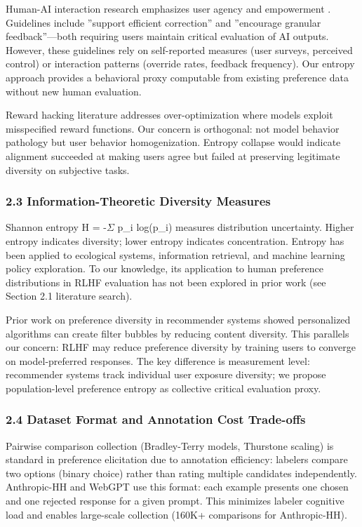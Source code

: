 Human-AI interaction research emphasizes user agency and empowerment \citep{amershi2019guidelines}. Guidelines include ''support efficient correction'' and ''encourage granular feedback''---both requiring users maintain critical evaluation of AI outputs. However, these guidelines rely on self-reported measures (user surveys, perceived control) or interaction patterns (override rates, feedback frequency). Our entropy approach provides a behavioral proxy computable from existing preference data without new human evaluation.

Reward hacking literature \citep{skalse2022misalignment} addresses over-optimization where models exploit misspecified reward functions. Our concern is orthogonal: not model behavior pathology but user behavior homogenization. Entropy collapse would indicate alignment succeeded at making users agree but failed at preserving legitimate diversity on subjective tasks.

\subsubsection{2.3 Information-Theoretic Diversity Measures}

Shannon entropy \citep{shannon1948information} H = -$\Sigma$ p\_i log(p\_i) measures distribution uncertainty. Higher entropy indicates diversity; lower entropy indicates concentration. Entropy has been applied to ecological systems, information retrieval, and machine learning policy exploration. To our knowledge, its application to human preference distributions in RLHF evaluation has not been explored in prior work (see Section 2.1 literature search).

Prior work on preference diversity in recommender systems \citep{nguyen2014exploring} showed personalized algorithms can create filter bubbles by reducing content diversity. This parallels our concern: RLHF may reduce preference diversity by training users to converge on model-preferred responses. The key difference is measurement level: recommender systems track individual user exposure diversity; we propose population-level preference entropy as collective critical evaluation proxy.

\subsubsection{2.4 Dataset Format and Annotation Cost Trade-offs}

Pairwise comparison collection (Bradley-Terry models, Thurstone scaling) is standard in preference elicitation due to annotation efficiency: labelers compare two options (binary choice) rather than rating multiple candidates independently. Anthropic-HH \citep{bai2022constitutional} and WebGPT \citep{nakano2021webgpt} use this format: each example presents one chosen and one rejected response for a given prompt. This minimizes labeler cognitive load and enables large-scale collection (160K+ comparisons for Anthropic-HH).

